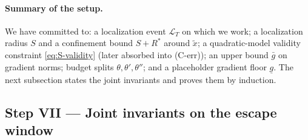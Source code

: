 \documentclass[11pt,a4paper]{article}
\theoremstyle{plain}
\theoremstyle{definition}
\newcommand{\snap}{\tilde{x}}
\newcommand{\glow}{\underline{g}}
\newcommand{\Rstar}{R^{*}}
\newcommand{\gup}{\bar g}
\begin{document}
\paragraph{Summary of the setup.}
We have committed to: a localization event $\mathcal{L}_T$ on which we work;
a localization radius $S$ and a confinement bound $S+\Rstar$ around $\snap$;
a quadratic-model validity constraint \eqref{eq:S-validity} (later absorbed
into (C-err)); an upper bound $\gup$ on gradient norms; budget splits
$\theta,\theta',\theta''$; and a placeholder gradient floor $\glow$. The
next subsection states the joint invariants and proves them by induction.

\subsection{Step VII --- Joint invariants on the escape window}
\label{ssec:induction}
\end{document}
